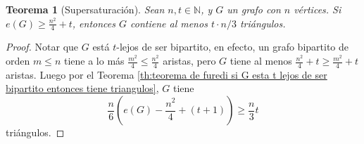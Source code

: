 \documentclass[12pt]{report}
\theoremstyle{plain}
\newtheorem{theorem}{Teorema}[section]
\theoremstyle{definition}
\newcommand{\naturals}{\mathbb{N}}
\begin{document}
\begin{theorem}[Supersaturación]
Sean $n,t \in \naturals$, y $G$ un grafo con $n$ vértices. Si $e(G) \geq \frac{n^2}{4} + t$, entonces $G$ contiene al menos $t \cdot n /3$ triángulos.
\end{theorem}
\begin{proof}
Notar que $G$ está $t$-lejos de ser bipartito, en efecto, un grafo bipartito de orden $m \leq n$ tiene a lo más $\frac{m^2}{4}\leq \frac{n^2}{4}$ aristas, pero $G$ tiene al menos $\frac{n^2}{4} + t \geq \frac{m^2}{4} + t$ aristas. Luego por el Teorema \ref{th:teorema de furedi si G esta t lejos de ser bipartito entonces tiene triangulos}, $G$ tiene
\[
    \frac{n}{6} \left ( e(G) - \frac{n^2}{4} + (t + 1) \right ) \geq \frac{n}{3} t
\]
triángulos.
\end{proof}


\bigskip
\end{document}
